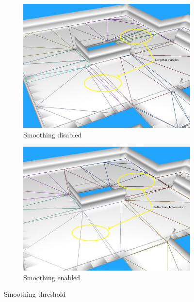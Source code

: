 \begin{itemize}
\begin{figure}[H]
        \centering
        \begin{subfigure}[b]{0.48\textwidth}
                \centering
                \includegraphics[width=\textwidth]{../images/smoothing_0.png}
                \caption{Smoothing disabled}
        \end{subfigure}
        \begin{subfigure}[b]{0.48\textwidth}
                \centering
                \includegraphics[width=\textwidth]{../images/smoothing_1.png}
                \caption{Smoothing enabled}
        \end{subfigure}
        \caption{Smoothing threshold}
	\end{figure}        


\end{itemize}
